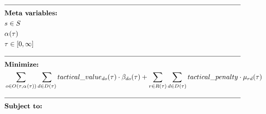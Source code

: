 \begin{alignat}{2}
	& \text{\rule{\linewidth}{0.4pt}} \notag\\
	& \textbf{Meta variables:}                                                                                                                                                                                                                                                             \notag\\
	& \ElementScheduler \in \SetScheduler                                                                                                                                                                                                                                                    \\
	& \VarStrategicWorkOrderAssignment{}{}                                                                                                                                                                                                                                                 \\
	& \tau \in [0, \infty]                                                                                                                                                                                                                                                                 \\
	& \text{\rule{\linewidth}{0.4pt}} \notag\\
	& \textbf{Minimize:}                                                                                                                                                                                                                                                                   \notag\\
	& \sum_{\ElementOperation \in \SetOperation{}{\VarStrategicWorkOrderAssignment{}{}}} \sum_{\ElementDays \in \SetDays{}} \ParTacticalValue \cdot \VarTacticalWork{\ElementDays}{\ElementOperation} + \sum_{r \in \SetResource} \sum_{\ElementDays \in \SetDays{}} \ParTacticalPenalty \cdot \VarTacticalExcess                                                                                                                                                                                \\  
	& \text{\rule{\linewidth}{0.4pt}} \notag\\
	& \textbf{Subject to:}                                                                                                                                                                                                                                                                 \notag\\

\end{alignat}
